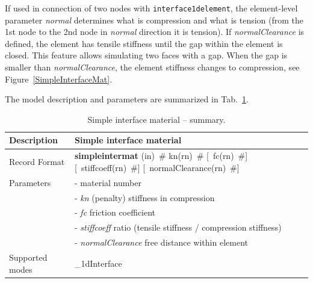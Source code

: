 \documentclass[a4paper]{article}
\newcommand{\descitem}[1]{{\noindent \bf #1}}
\newcommand{\elemparam}[2]{{{#1\tiny (#2)}~\#}}
\newcommand{\optelemparam}[2]{[{~\elemparam{#1}{#2}}]}
\newcommand{\param}[1]{{\it #1}}
\begin{document}
If used in connection of two nodes with {\tt interface1delement}, the element-level parameter \param{normal} determines what is compression and what is tension (from the 1st node to the 2nd node in \param{normal} direction it is tension). If \param{normalClearance} is defined, the element has tensile stiffness until the gap within the element is closed. This feature allows simulating two faces with a gap. When the gap is smaller than \param{normalClearance}, the element stiffness changes to compression, see Figure~\ref{SimpleInterfaceMat}. 

The model description and parameters are summarized in Tab.~\ref{simpleinterfacemat_table}.

\begin{table}[!htb]
\begin{tabular}{|l|p{9cm}|}
\hline
Description & Simple interface material\\
\hline
Record Format & \descitem{simpleintermat}  \elemparam{}{in}
\elemparam{kn}{rn} \optelemparam{fc}{rn} \optelemparam{stiffcoeff}{rn} \optelemparam{normalClearance}{rn}\\
Parameters &- \param{} material number\\
&- \param{kn} (penalty) stiffness in compression\\
&- \param{fc} friction coefficient\\
&- \param{stiffcoeff} ratio (tensile stiffness / compression stiffness)\\
&- \param{normalClearance} free distance within element\\

Supported modes& \_1dInterface\\
\hline
\end{tabular}
\caption{Simple interface material -- summary.}
\label{simpleinterfacemat_table}
\end{table}
\end{document}
